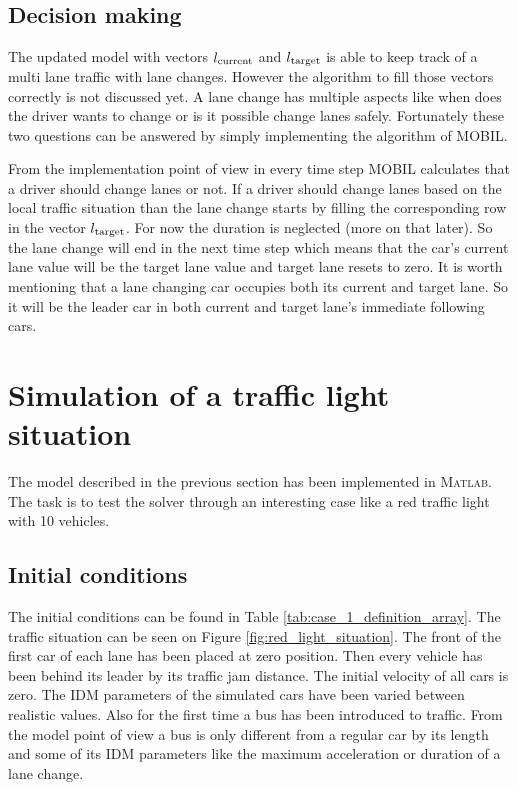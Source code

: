 		\subsection*{Decision making}
		The updated model with vectors $l_{\rm current}$ and $l_{\rm target}$ is able to keep track of a multi lane traffic with lane changes. However the algorithm to fill those vectors correctly is not discussed yet. A lane change has multiple aspects like when does the driver wants to change or is it possible change lanes safely. Fortunately these two questions can be answered by simply implementing the algorithm of MOBIL.

		From the implementation point of view in every time step MOBIL calculates that a driver should change lanes or not. If a driver should change lanes based on the local traffic situation than the lane change starts by filling the corresponding row in the vector $l_{\rm target}$. For now the duration is neglected (more on that later). So the lane change will end in the next time step which means that the car's current lane value will be the target lane value and target lane resets to zero. It is worth mentioning that a lane changing car occupies both its current and target lane. So it will be the leader car in both current and target lane's immediate following cars.
	\section{Simulation of a traffic light situation}
		The model described in the previous section has been implemented in \textsc{Matlab}. The task is to test the solver through an interesting case like a red traffic light with 10 vehicles.
		\subsection*{Initial conditions}
		The initial conditions can be found in Table \ref{tab:case_1_definition_array}. The traffic situation can be seen on Figure \ref{fig:red_light_situation}. The front of the first car of each lane has been placed at zero position. Then every vehicle has been behind its leader by its traffic jam distance. The initial velocity of all cars is zero.  The IDM parameters of the simulated cars have been varied between realistic values. Also for the first time a bus has been introduced to traffic. From the model point of view a bus is only different from a regular car by its length and some of its IDM parameters like the maximum acceleration or duration of a lane change.
		
